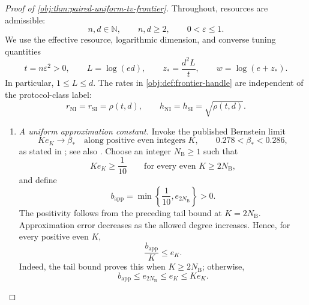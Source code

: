 \documentclass[11pt]{article}
\begin{document}
\begin{proof}[Proof of \cref{obj:thm:paired-uniform-tv-frontier}]
Throughout, resources are admissible:
\[
n,d\in\mathbb N,\qquad n,d\ge2,\qquad 0<\varepsilon\le1.
\]
We use the effective resource, logarithmic dimension, and converse tuning quantities
\[
t=n\varepsilon^2>0,\qquad L=\log(ed),\qquad
z_*=\frac{d^2L}{t},\qquad w=\log(e+z_*).
\]
In particular, \(1\le L\le d\). The rates in \cref{obj:def:frontier-handle} are independent of the protocol-class label:
\[
r_{\mathrm{NI}}=r_{\mathrm{SI}}=\rho(t,d),
\qquad
h_{\mathrm{NI}}=h_{\mathrm{SI}}=\sqrt{\rho(t,d)}.
\]

\begin{enumerate}
\item \textit{A uniform approximation constant.}
Invoke the published Bernstein limit
\[
K e_K\longrightarrow\beta_*
\quad\text{along positive even integers }K,
\qquad 0.278<\beta_*<0.286,
\]
as stated in \citep[Section 3.1, definition of the Bernstein constant and the immediately following paragraph, p.~8]{CaiLow2011Nonsmooth}; see also \citep{Bernstein1913}.
Choose an integer \(N_{\mathrm B}\ge1\) such that
\[
K e_K\ge\frac1{10}
\qquad\text{for every even }K\ge2N_{\mathrm B},
\]
and define
\[
b_{\mathrm{app}}
=\min\left\{\frac1{10},e_{2N_{\mathrm B}}\right\}>0.
\]
The positivity follows from the preceding tail bound at \(K=2N_{\mathrm B}\).
Approximation error decreases as the allowed degree increases. Hence, for every positive even \(K\),
\[
\frac{b_{\mathrm{app}}}{K}\le e_K.
\]
Indeed, the tail bound proves this when \(K\ge2N_{\mathrm B}\); otherwise,
\[
b_{\mathrm{app}}\le e_{2N_{\mathrm B}}\le e_K\le K e_K.
\]


\end{enumerate}
\end{proof}
\end{document}
